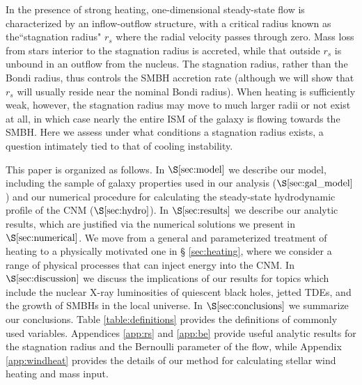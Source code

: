 \documentclass[usenatbib,fleqn]{mn2e}
\newcommand{\rs}{r_s}
\begin{document}
In the presence of strong heating, one-dimensional steady-state flow
is characterized by an inflow-outflow structure, with a critical
radius known as the``stagnation radius" $\rs$ where the radial
velocity passes through zero.  Mass loss from stars interior to the
stagnation radius is accreted, while that outside $\rs$ is unbound in
an outflow from the nucleus.  The stagnation radius, rather than the
Bondi radius, thus controls the SMBH accretion rate (although we will
show that $\rs$ will usually reside near the nominal Bondi
radius).  When heating is sufficiently weak, however, the stagnation
radius may move to much larger radii or not exist at all, in which
case nearly the entire ISM of the galaxy is flowing towards the SMBH.
Here we assess under what conditions a stagnation
radius exists, a question intimately tied to that of cooling
instability.


This paper is organized as follows.  In $\S\ref{sec:model}$ we
describe our model, including the sample of galaxy properties used in
our analysis ($\S\ref{sec:gal_model}$) and our numerical procedure for
calculating the steady-state hydrodynamic profile of the CNM
($\S\ref{sec:hydro}$).  In $\S\ref{sec:results}$ we describe our
analytic results, which are justified via the numerical solutions we
present in $\S\ref{sec:numerical}$.  We move from a general and
parameterized treatment of heating to a physically motivated one in \S
\ref{sec:heating}, where we consider a range of physical processes
that can inject energy into the CNM.  In $\S\ref{sec:discussion}$ we
discuss the implications of our results for topics which include the
nuclear X-ray luminosities of quiescent black holes, jetted TDEs, and
the growth of SMBHs in the local universe.  In
$\S\ref{sec:conclusions}$ we summarize our conclusions.  Table
\ref{table:definitions} provides the definitions of commonly used
variables.  Appendices \ref{app:rs} and \ref{app:be} provide useful
analytic results for the stagnation radius and the Bernoulli parameter
of the flow, while Appendix \ref{app:windheat} provides the details of
our method for calculating stellar wind heating and mass input.
\end{document}
